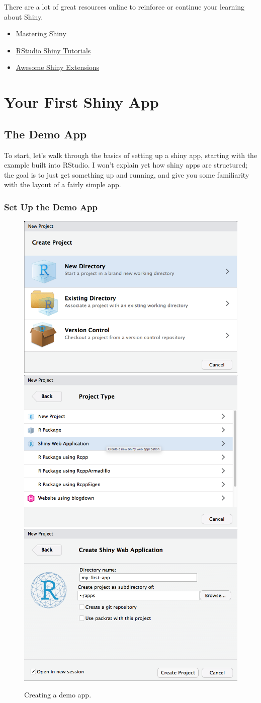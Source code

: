 \documentclass[
  oneside]{book}
\providecommand{\tightlist}{%
  \setlength{\itemsep}{0pt}\setlength{\parskip}{0pt}}
\begin{document}
There are a lot of great resources online to reinforce or continue your learning about Shiny.

\begin{itemize}
\tightlist
\item
  \href{https://mastering-shiny.org/}{Mastering Shiny}
\item
  \href{https://shiny.rstudio.com/tutorial/}{RStudio Shiny Tutorials}
\item
  \href{https://github.com/nanxstats/awesome-shiny-extensions}{Awesome Shiny Extensions}
\end{itemize}

\hypertarget{first-app}{%
\chapter{Your First Shiny App}\label{first-app}}

\hypertarget{the-demo-app}{%
\section{The Demo App}\label{the-demo-app}}

To start, let's walk through the basics of setting up a shiny app, starting with the example built into RStudio. I won't explain yet how shiny apps are structured; the goal is to just get something up and running, and give you some familiarity with the layout of a fairly simple app.

\hypertarget{set-up-the-demo-app}{%
\subsection{Set Up the Demo App}\label{set-up-the-demo-app}}

\begin{figure}

{\centering \includegraphics[width=0.3\linewidth]{images/demo_app/01-create-project} \includegraphics[width=0.3\linewidth]{images/demo_app/02-project-type} \includegraphics[width=0.3\linewidth]{images/demo_app/03-project-directory} 

}

\caption{Creating a demo app.}\label{fig:first-demo}
\end{figure}
\end{document}
